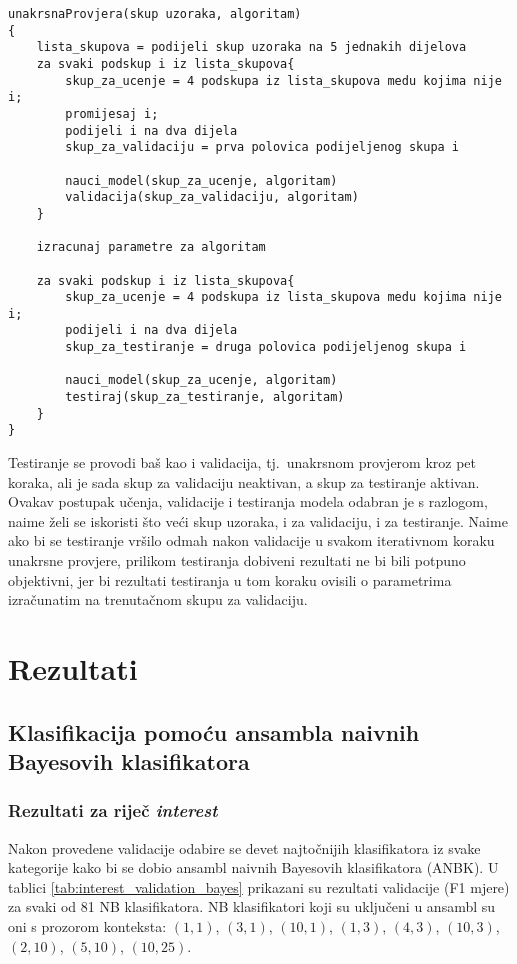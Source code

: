 \documentclass[10pt, a4paper]{article}
\begin{document}
\begin{lstlisting}[label=lst:Convolution1D,caption= Pseudok\^od implementirane unakrsne provjere]
unakrsnaProvjera(skup uzoraka, algoritam)
{
	lista_skupova = podijeli skup uzoraka na 5 jednakih dijelova
	za svaki podskup i iz lista_skupova{
		skup_za_ucenje = 4 podskupa iz lista_skupova medu kojima nije i;
		promijesaj i;
		podijeli i na dva dijela
		skup_za_validaciju = prva polovica podijeljenog skupa i
		
		nauci_model(skup_za_ucenje, algoritam)
		validacija(skup_za_validaciju, algoritam)
	}
		
	izracunaj parametre za algoritam
	
	za svaki podskup i iz lista_skupova{
		skup_za_ucenje = 4 podskupa iz lista_skupova medu kojima nije i;
		podijeli i na dva dijela
		skup_za_testiranje = druga polovica podijeljenog skupa i
		
		nauci_model(skup_za_ucenje, algoritam)
		testiraj(skup_za_testiranje, algoritam)
	} 	
}
\end{lstlisting}


Testiranje se provodi baš kao i validacija, tj.~unakrsnom provjerom kroz pet koraka, 
ali je sada skup za validaciju neaktivan, a skup za testiranje aktivan.
Ovakav postupak učenja, validacije i testiranja modela odabran je s razlogom, naime
želi se iskoristi što veći skup uzoraka, i za validaciju, i za testiranje.
Naime ako bi se testiranje vršilo odmah nakon validacije u svakom iterativnom
koraku unakrsne provjere, prilikom testiranja dobiveni rezultati ne bi bili
potpuno objektivni, jer bi rezultati testiranja u tom koraku ovisili
o parametrima izračunatim na trenutačnom skupu za validaciju. %

\section{Rezultati}
\subsection{Klasifikacija pomoću ansambla naivnih Bayesovih klasifikatora}
\subsubsection{Rezultati za riječ \emph{interest}} 
Nakon provedene validacije odabire se devet najtočnijih klasifikatora iz
svake kategorije kako bi se dobio ansambl naivnih Bayesovih klasifikatora (ANBK). 
U tablici \ref{tab:interest_validation_bayes} prikazani su rezultati
validacije (F1 mjere) za svaki od 81 NB klasifikatora. 
NB klasifikatori koji su uključeni u ansambl su oni
s prozorom konteksta: $(1,1)$, $(3,1)$, $(10,1)$,
$(1,3)$, $(4,3)$, $(10,3)$, $(2,10)$, $(5,10)$, $(10,25)$.
\end{document}
